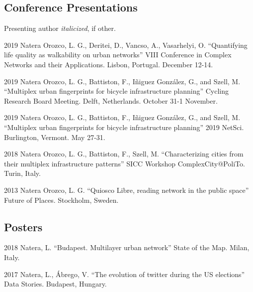 \documentclass{academiccv}
\begin{document}

\subsection*{Conference Presentations}
Presenting author \textit{italicized}, if other.\bigskip
\begin{tablist}
	\item[2019] \tab Natera Orozco, L. G., Deritei, D., Vancso, A., Vasarhelyi, O. \enquote{Quantifying life quality as walkability on urban networks} VIII Conference in Complex Networks and their Applications. Lisbon, Portugal. December 12-14.
	\item[2019] \tab Natera Orozco, L. G., Battiston, F., Iñiguez González, G., and Szell, M. \enquote{Multiplex urban fingerprints for bicycle infrastructure planning} Cycling Research Board Meeting. Delft, Netherlands. October 31-1 November.
	\item[2019] \tab Natera Orozco, L. G., Battiston, F., Iñiguez González, G., and Szell, M. \enquote{Multiplex urban fingerprints for bicycle infrastructure planning} 2019 NetSci. Burlington, Vermont. May 27-31.
	\item[2018] \tab Natera Orozco, L. G., Battiston, F., Szell, M. \enquote{Characterizing cities from their multiplex infrastructure patterns} SICC Workshop ComplexCity@PoliTo. Turin, Italy.
	\item[2013] \tab Natera Orozco, L. G. \enquote{Quiosco Libre, reading network in the public space} Future of Places. Stockholm, Sweden.
\end{tablist}

\subsection*{Posters}
\begin{tablist}
	\item[2018] \tab Natera, L. \enquote{Budapest. Multilayer urban network} State of the Map. Milan, Italy.
	\item[2017] \tab Natera, L., Ábrego, V. \enquote{The evolution of twitter during the US elections} Data Stories. Budapest, Hungary.
\end{tablist}
\end{document}
